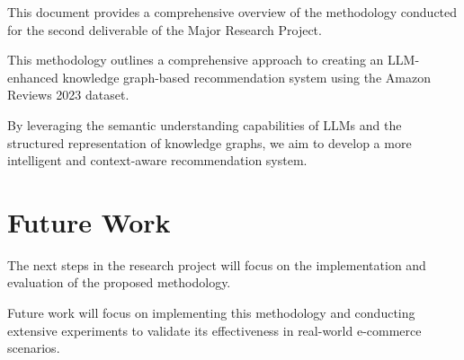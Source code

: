 \documentclass{article}
\begin{document}
This document provides a comprehensive overview of the methodology conducted for the second deliverable of the Major Research Project.

This methodology outlines a comprehensive approach to creating an LLM-enhanced knowledge graph-based recommendation system using the Amazon Reviews 2023 dataset. 

By leveraging the semantic understanding capabilities of LLMs and the structured representation of knowledge graphs, we aim to develop a more intelligent and context-aware recommendation system.


\section{Future Work}

The next steps in the research project will focus on the implementation and evaluation of the proposed methodology. 

Future work will focus on implementing this methodology and conducting extensive experiments to validate its effectiveness in real-world e-commerce scenarios.

\printbibliography
\clearpage

\appendix
\end{document}
